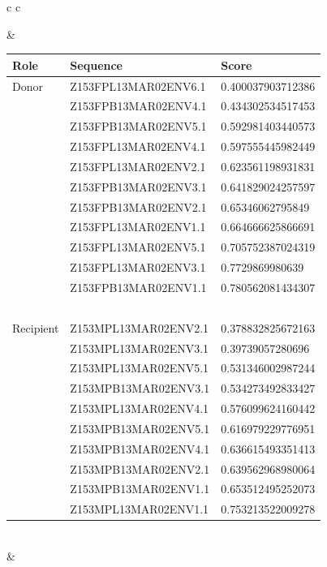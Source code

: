 \documentclass[conference]{IEEEtran}
\begin{document}
\begin{table}[]
\begin{tabular}{ c c}
\begin{minipage}{.4\textwidth}
\end{minipage}
&	\begin{tabular}{l l l}
		\textbf{Role} & \textbf{Sequence} & \textbf{Score}\\
	\hline
Donor &	Z153FPL13MAR02ENV6.1	&	0.400037903712386	\\
&	Z153FPB13MAR02ENV4.1	&	0.434302534517453	\\
&	Z153FPB13MAR02ENV5.1	&	0.592981403440573	\\
&	Z153FPL13MAR02ENV4.1	&	0.597555445982449	\\
&	Z153FPL13MAR02ENV2.1	&	0.623561198931831	\\
&	Z153FPB13MAR02ENV3.1	&	0.641829024257597	\\
&	Z153FPB13MAR02ENV2.1	&	0.65346062795849	\\
&	Z153FPL13MAR02ENV1.1	&	0.664666625866691	\\
&	Z153FPL13MAR02ENV5.1	&	0.705752387024319	\\
&	Z153FPL13MAR02ENV3.1	&	0.7729869980639	\\
&	Z153FPB13MAR02ENV1.1	&	0.780562081434307	\\
& \ &\ \\
\hline
Recipient &	Z153MPL13MAR02ENV2.1	&	0.378832825672163	\\
&	Z153MPL13MAR02ENV3.1	&	0.39739057280696	\\
&	Z153MPL13MAR02ENV5.1	&	0.531346002987244	\\
&	Z153MPB13MAR02ENV3.1	&	0.534273492833427	\\
&	Z153MPL13MAR02ENV4.1	&	0.576099624160442	\\
&	Z153MPB13MAR02ENV5.1	&	0.616979229776951	\\
&	Z153MPB13MAR02ENV4.1	&	0.636615493351413	\\
&	Z153MPB13MAR02ENV2.1	&	0.639562968980064	\\
&	Z153MPB13MAR02ENV1.1	&	0.653512495252073	\\
&	Z153MPL13MAR02ENV1.1	&	0.753213522009278	\\
\end{tabular}\\
\hline
& \ \\
\begin{minipage}{.4\textwidth}

\end{minipage}
\end{tabular}
\end{table}
\end{document}
